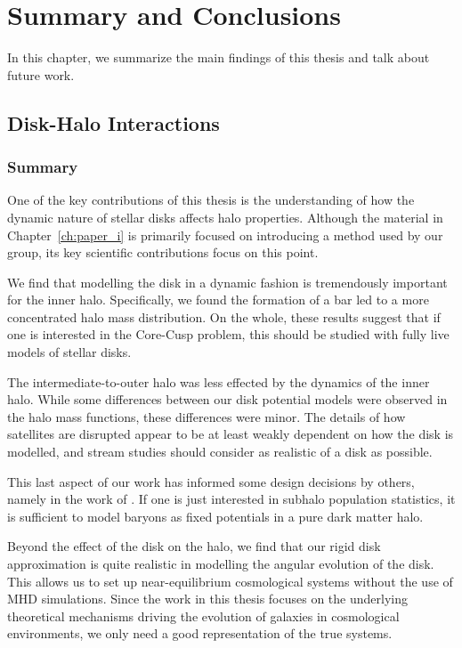 \chapter{Summary and Conclusions}\label{ch:conclusion}
\newpage


In this chapter, we summarize the  main findings of this thesis and talk about future work.


\section{Disk-Halo Interactions}


\subsection{Summary}

One of the key contributions of this thesis is the understanding of how the dynamic nature of stellar disks affects halo properties. Although the material in Chapter~\ref{ch:paper_i} is primarily focused on introducing a method used by our group, its key scientific contributions focus on this point.

We find that modelling the disk in a dynamic fashion is tremendously important for the inner halo. Specifically, we found the formation of a bar led to a more concentrated halo mass distribution. On the whole, these results suggest that if one is interested in the Core-Cusp problem, this should be studied with fully live models of stellar disks.

The intermediate-to-outer halo was less effected by the dynamics of the inner halo. While some differences between our disk potential models were observed in the halo mass functions, these differences were minor. The details of how satellites are disrupted appear to be at least weakly dependent on how the disk is modelled, and stream studies should consider as realistic of a disk as possible.

This last aspect of our work has informed some design decisions by others, namely in the work of \citet{read_2019}. If one is just interested in subhalo population statistics, it is sufficient to model baryons as fixed potentials in a pure dark matter halo. 

Beyond the effect of the disk on the halo, we find that our rigid disk approximation is quite realistic in modelling the angular evolution of the disk. This allows us to set up near-equilibrium cosmological systems without the use of MHD simulations. Since the work in this thesis focuses on the underlying theoretical mechanisms driving the evolution of galaxies in cosmological environments, we only need a good representation of the true systems.

